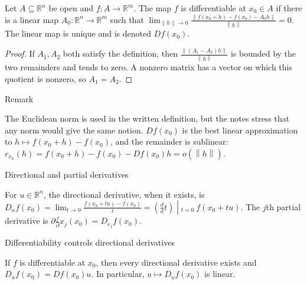 \begin{definition}{}

Let \(A \subseteq \mathbb{R}^{n}\) be open and \(f:A\rightarrow\mathbb{R}^{m}\). The map \(f\) is differentiable at \(x_{0} \in A\) if there is a linear map \(A_{0}:\mathbb{R}^{n}\rightarrow\mathbb{R}^{m}\) such that \(\lim_{{\| h\|}\rightarrow 0}\frac{\left\| {f\left( {x_{0} + h} \right) - f\left( x_{0} \right) - A_{0}h} \right\|}{\left\| h \right\|} = 0\). The linear map is unique and is denoted \(Df\left( x_{0} \right)\).

\end{definition}

\begin{proof}

If \(A_{1},A_{2}\) both satisfy the definition, then \(\frac{\left\| {\left( {A_{1} - A_{2}} \right)h} \right\|}{\left\| h \right\|}\) is bounded by the two remainders and tends to zero. A nonzero matrix has a vector on which this quotient is nonzero, so \(A_{1} = A_{2}\).

\end{proof}

\begin{qlremark}{Remark}

The Euclidean norm is used in the written definition, but the notes stress that any norm would give the same notion. \(Df\left( x_{0} \right)\) is the best linear approximation to \(h\mapsto f\left( {x_{0} + h} \right) - f\left( x_{0} \right)\), and the remainder is sublinear: \(r_{x_{0}}(h) = f\left( {x_{0} + h} \right) - f\left( x_{0} \right) - Df\left( x_{0} \right)h = o\left( \left\| h \right\| \right)\).

\end{qlremark}

\begin{definition}{Directional and partial derivatives}

For \(u \in \mathbb{R}^{n}\), the directional derivative, when it exists, is \(\left. D_{u}f\left( x_{0} \right) = \lim_{t\rightarrow 0}\frac{f\left( {x_{0} + tu} \right) - f\left( x_{0} \right)}{t} = \left( {\frac{d}{d}t} \right) \middle| {}_{t = 0}\ f\left( {x_{0} + tu} \right) \right.\). The \(j\)th partial derivative is \(\partial\frac{f}{\partial}x_{j}\left( x_{0} \right) = D_{e_{j}}f\left( x_{0} \right)\).

\end{definition}

\begin{theorem}{Differentiability controls directional derivatives}

If \(f\) is differentiable at \(x_{0}\), then every directional derivative exists and \(D_{u}f\left( x_{0} \right) = Df\left( x_{0} \right)u\). In particular, \(u\mapsto D_{u}f\left( x_{0} \right)\) is linear.

\end{theorem}

